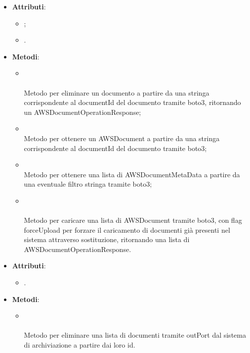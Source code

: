 \documentclass[10pt, a4paper]{article}
\begin{document}
\label{AWSS3ManagerDettaglio}
\begin{itemize}
    \item \textbf{Attributi}:
    \begin{itemize}
        \item {};
        \item {}.
    \end{itemize}
    \item \textbf{Metodi}:
    \begin{itemize}
        \item {}\\ \\
        Metodo per eliminare un documento a partire da una stringa corrispondente al documentId del documento tramite boto3, ritornando un AWSDocumentOperationResponse;
        \item {}\\
        Metodo per ottenere un AWSDocument a partire da una stringa corrispondente al documentId del documento tramite boto3;
        \item {}\\
        Metodo per ottenere una lista di AWSDocumentMetaData a partire da una eventuale filtro stringa tramite boto3; 
        \item {}\\  \\ 
        Metodo per caricare una lista di AWSDocument tramite boto3, con flag forceUpload per forzare il caricamento di documenti già presenti nel sistema attraverso sostituzione, ritornando una lista di AWSDocumentOperationResponse.
    \end{itemize}
\end{itemize}


\label{DeleteDocumentsDettaglio}
\begin{itemize}
    \item \textbf{Attributi}:
    \begin{itemize}
        \item {}. 
    \end{itemize}
    \item \textbf{Metodi}:
    \begin{itemize}
        \item {}\\ \\
        Metodo per eliminare una lista di documenti tramite outPort dal sistema di archiviazione a partire dai loro id.
    \end{itemize}
\end{itemize}
\end{document}
